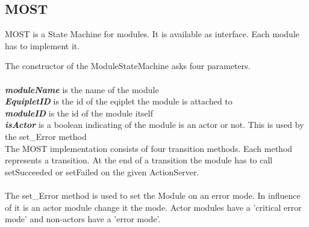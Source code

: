 
\subsection{MOST}

\begin{figure}
\end{figure}

MOST is a State Machine for modules.
It is available as interface.
Each module has to implement it. 

The constructor of the ModuleStateMachine asks four parameters. \\
\\
\textbf{\textit{moduleName}} is the name of the module \\
\textbf{\textit{EquipletID}} is the id of the eqiplet the module is attached to \\
\textbf{\textit{moduleID}} is the id of the module itself \\
\textbf{\textit{isActor}} is a boolean indicating of the module is an actor or not. This is used by the set\_Error method \\

\noindent
The MOST implementation consists of four transition methods.
Each method represents a transition.
At the end of a transition the module has to call setSucceeded or setFailed on the given ActionServer.
\\\\
The set\_Error method is used to set the Module on an error mode. In influence of it is an actor module change it the mode. Actor modules have a 'critical error mode' and non-actors have a 'error mode'.

